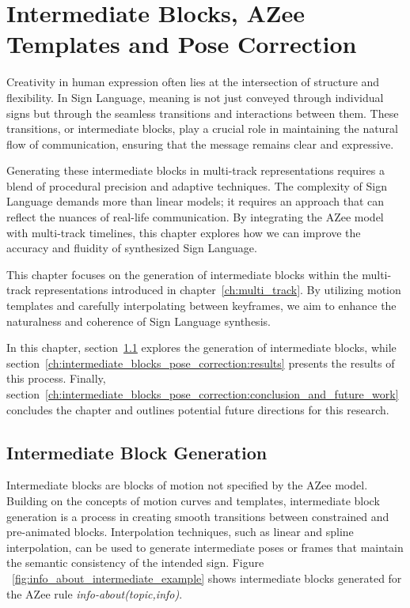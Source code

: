 \documentclass[../../main.tex]{subfiles}
\begin{document}
\chapter{Intermediate Blocks, AZee Templates and Pose Correction}
\label{ch:intermediate_blocks_pose_correction}

Creativity in human expression often lies at the intersection of structure and flexibility. In Sign Language, meaning is not just conveyed through individual signs but through the seamless transitions and interactions between them. These transitions, or intermediate blocks, play a crucial role in maintaining the natural flow of communication, ensuring that the message remains clear and expressive.

Generating these intermediate blocks in multi-track representations requires a blend of procedural precision and adaptive techniques. The complexity of Sign Language demands more than linear models; it requires an approach that can reflect the nuances of real-life communication. By integrating the AZee model with multi-track timelines, this chapter explores how we can improve the accuracy and fluidity of synthesized Sign Language.

This chapter focuses on the generation of intermediate blocks within the multi-track representations introduced in chapter~\ref{ch:multi_track}. By utilizing motion templates and carefully interpolating between keyframes, we aim to enhance the naturalness and coherence of Sign Language synthesis.

In this chapter, section~\ref{ch:intermediate_blocks_pose_correction:intermediate_block_generation} explores the generation of intermediate blocks, while section~\ref{ch:intermediate_blocks_pose_correction:results} presents the results of this process. Finally, section~\ref{ch:intermediate_blocks_pose_correction:conclusion_and_future_work} concludes the chapter and outlines potential future directions for this research.

\section{Intermediate Block Generation}
\label{ch:intermediate_blocks_pose_correction:intermediate_block_generation}


Intermediate blocks are blocks of motion not specified by the AZee model. Building on the concepts of motion curves and templates, intermediate block generation is a process in creating smooth transitions between constrained and pre-animated blocks. Interpolation techniques, such as linear and spline interpolation, can be used to generate intermediate poses or frames that maintain the semantic consistency of the intended sign. Figure ~\ref{fig:info_about_intermediate_example} shows intermediate blocks generated for the AZee rule \emph{info-about(topic,info)}.
\end{document}
